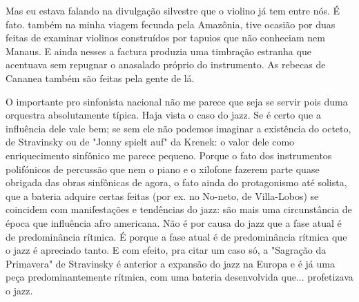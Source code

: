 Mas eu estava falando na divulgação silvestre que o violino já tem entre
nós. É fato. também na minha viagem fecunda pela Amazônia, tive ocasião
por duas feitas de examinar violinos construídos por tapuios que não
conheciam nem Manaus. E ainda nesses a factura produzia uma timbração
estranha que acentuava sem repugnar o anasalado próprio do instrumento.
As rebecas de Cananea também são feitas pela gente de lá.~

O importante pro sinfonista nacional não me parece que seja se servir
pois duma orquestra absolutamente típica. Haja vista o caso do jazz. Se
é certo que a influência dele vale bem; se sem ele não podemos imaginar
a existência do octeto, de Stravinsky ou de "Jonny spielt auf" da
Krenek: o valor dele como enriquecimento sinfônico me parece pequeno.
Porque o fato dos instrumentos polifónicos de percussão que nem o piano
e o xilofone fazerem parte quase obrigada das obras sinfônicas de agora,
o fato ainda do protagonismo até solista, que a bateria adquire certas
feitas (por ex. no No-neto, de Villa-Lobos) se coincidem com
manifestações e tendências do jazz: são mais uma circunstância de época
que influência afro americana. Não é por causa do jazz que a fase atual
é de predominância rítmica. É porque a fase atual é de predominância
rítmica que o jazz é apreciado tanto. E com efeito, pra citar um caso
só, a "Sagração da Primavera" de Stravinsky é anterior a expansão do
jazz na Europa e é já uma peça predominantemente rítmica, com uma
bateria desenvolvida que... profetizava o jazz.~

